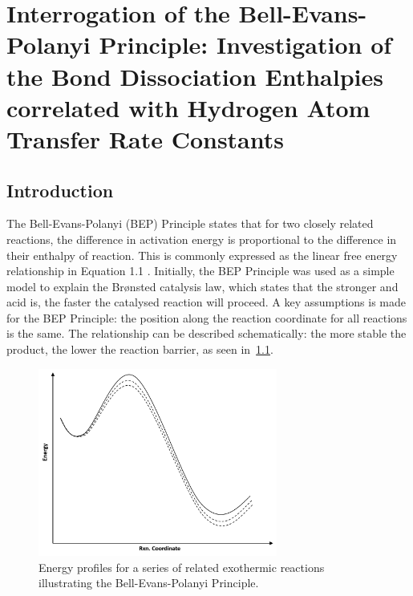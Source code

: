 
\chapter{Interrogation of the Bell-Evans-Polanyi Principle: Investigation of the Bond Dissociation Enthalpies correlated with Hydrogen Atom Transfer Rate Constants}
\label{ch:bde}


\section{Introduction}

The Bell-Evans-Polanyi (BEP) Principle states that for two closely related reactions, the difference in activation energy is proportional to the difference in their enthalpy of reaction.\cite{Bell1936,Evans1938,Dill2003} This is commonly expressed as the linear free energy relationship in Equation 1.1 . Initially, the BEP Principle was used as a simple model to explain the Br{\o}nsted catalysis law, which states that the stronger and acid is, the faster the catalysed reaction will proceed.\cite{Bronsted1924} A key assumptions is made for the BEP Principle: the position along the reaction coordinate for all reactions is the same. The relationship can be described schematically: the more stable the product, the lower the reaction barrier, as seen in~\ref{fig:bep}.

\begin{figure}[htb]
  \centering
  \includegraphics[width=0.7\textwidth]{figures/bep}
  \caption{Energy profiles for a series of related exothermic reactions illustrating the Bell-Evans-Polanyi Principle.}
\label{fig:bep}
\end{figure}

